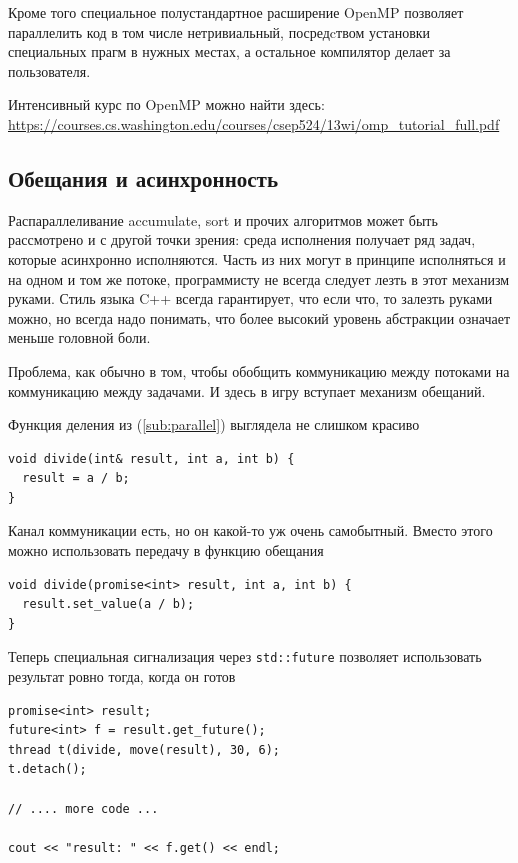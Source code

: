 \documentclass[a4paper,12pt,oneside]{book}
\begin{document}
Кроме того специальное полустандартное расширение OpenMP позволяет параллелить код в том числе нетривиальный, посредcтвом установки специальных прагм в нужных местах, а остальное компилятор делает за пользователя.

Интенсивный курс по OpenMP можно найти здесь: \url{https://courses.cs.washington.edu/courses/csep524/13wi/omp_tutorial_full.pdf}

\subsection{Обещания и асинхронность}\label{sub:async}

Распараллеливание accumulate, sort и прочих алгоритмов может быть рассмотрено и с другой точки зрения: среда исполнения получает ряд задач, которые асинхронно исполняются. Часть из них могут в принципе исполняться и на одном и том же потоке, программисту не всегда следует лезть в этот механизм руками. Стиль языка C++ всегда гарантирует, что если что, то залезть руками можно, но всегда надо понимать, что более высокий уровень абстракции означает меньше головной боли.

Проблема, как обычно в том, чтобы обобщить коммуникацию между потоками на коммуникацию между задачами. И здесь в игру вступает механизм обещаний.

Функция деления из (\ref{sub:parallel}) выглядела не слишком красиво

\begin{lstlisting}
void divide(int& result, int a, int b) {
  result = a / b;
}
\end{lstlisting}

Канал коммуникации есть, но он какой-то уж очень самобытный. Вместо этого можно использовать передачу в функцию обещания

\begin{lstlisting}
void divide(promise<int> result, int a, int b) {
  result.set_value(a / b);
}
\end{lstlisting}

Теперь специальная сигнализация через \lstinline!std::future! позволяет использовать результат ровно тогда, когда он готов

\begin{lstlisting}
promise<int> result;
future<int> f = result.get_future();
thread t(divide, move(result), 30, 6);
t.detach();

// .... more code ...

cout << "result: " << f.get() << endl;
\end{lstlisting}
\end{document}
